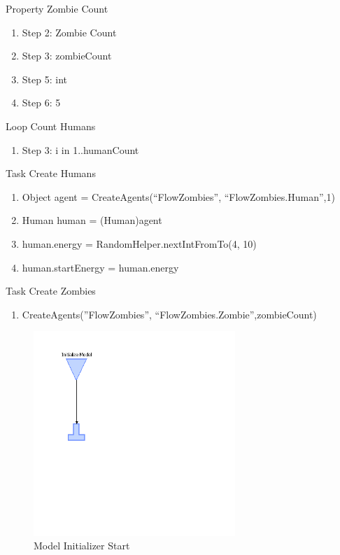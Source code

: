 \documentclass[11pt]{amsart}
\begin{document}
Property Zombie Count
\begin{enumerate}
 \item Step 2: Zombie Count
 \item Step 3: zombieCount 
 \item Step 5: int
 \item Step 6: 5
\end{enumerate}

Loop Count Humans
\begin{enumerate} 
 \item Step 3: i in 1..humanCount
\end{enumerate}

Task Create Humans
\begin{enumerate}
 \item Object agent = CreateAgents(``FlowZombies'', ``FlowZombies.Human'',1)
 \item Human human = (Human)agent
 \item  human.energy = RandomHelper.nextIntFromTo(4, 10)
 \item  human.startEnergy = human.energy
\end{enumerate}

Task Create Zombies
\begin{enumerate}
 \item CreateAgents(''FlowZombies'', ``FlowZombies.Zombie'',zombieCount)
\end{enumerate}

\begin{figure}[p]
\begin{center}
\vspace{.2in}
\centerline {
\includegraphics[width=3in]{figs/ModelInitializer_start.png}
}
\caption{Model Initializer Start}
\label{fig:mistart}
\end{center}
\end{figure}
\end{document}
